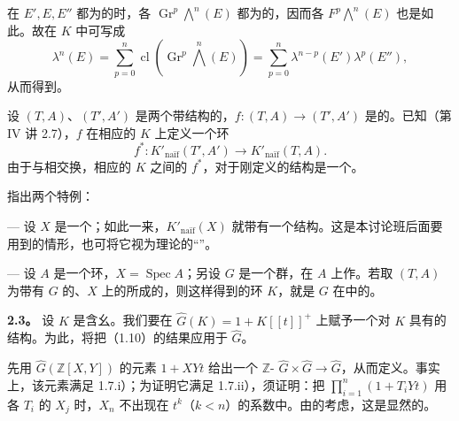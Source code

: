 在 $E',E,E''$ 都为的时，各 $\operatorname{Gr}^p\bigwedge^n(E)$ 都为的，因而各 $F^p\bigwedge^n(E)$ 也是如此。故在 $K$ 中可写成
\[
\lambda^n(E)=\sum_{p=0}^n\operatorname{cl}(\operatorname{Gr}^p\bigwedge^n(E))
=\sum_{p=0}^n\lambda^{n-p}(E')\lambda^p(E''),
\]
从而得到。

设 $(T,A)$、$(T',A')$ 是两个带结构的，$f:(T,A)\longrightarrow(T',A')$ 是的。已知（第 IV 讲 2.7），$f$ 在相应的 $K$ 上定义一个环
\[
f^*:K'_{\text{naïf}}(T',A')\longrightarrow K'_{\text{naïf}}(T,A).
\]
由于与相交换，相应的 $K$ 之间的 $f^*$，对于刚定义的结构是一个。

指出两个特例：

--- 设 $X$ 是一个；如此一来，$K'_{\text{naïf}}(X)$ 就带有一个结构。这是本讨论班后面要用到的情形，也可将它视为理论的“”。

--- 设 $A$ 是一个环，$X=\operatorname{Spec}A$；另设 $G$ 是一个群，在 $A$ 上作。若取 $(T,A)$ 为带有 $G$ 的、$X$ 上的所成的，则这样得到的环 $K$，就是 $G$ 在中的。

\textbf{2.3。} 设 $K$ 是含幺。我们要在 $\widehat G(K)=1+K[[t]]^+$ 上赋予一个对 $K$ 具有的结构。为此，将把（1.10）的结果应用于 $\widehat G$。

先用 $\widehat G(\mathbb Z[X,Y])$ 的元素 $1+XYt$ 给出一个 $\mathbb Z$- $\widehat G\times\widehat G\longrightarrow\widehat G$，从而定义。事实上，该元素满足 1.7.i）；为证明它满足 1.7.ii），须证明：把 $\prod_{i=1}^n(1+T_iYt)$ 用各 $T_i$ 的 $X_j$ 时，$X_n$ 不出现在 $t^k$（$k<n$）的系数中。由的考虑，这是显然的。

